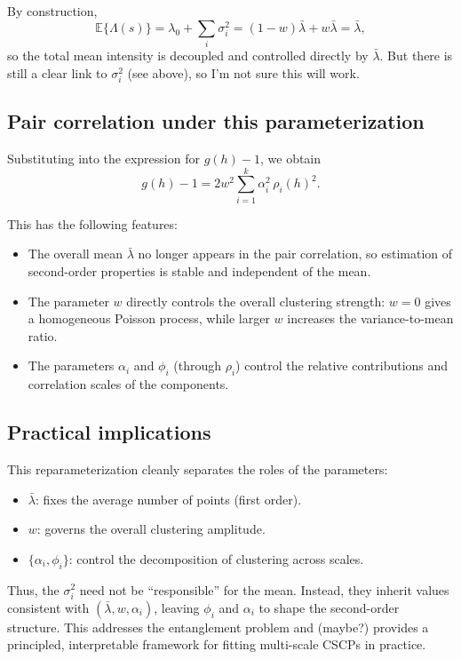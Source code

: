 \documentclass[11pt]{article}
\begin{document}
By construction,
\[
\mathbb E\{\Lambda(s)\} = \lambda_0 + \sum_i \sigma_i^2 = (1-w)\bar\lambda + w\bar\lambda = \bar\lambda,
\]
so the total mean intensity is decoupled and controlled directly by $\bar\lambda$. But there is still a clear link to $\sigma_i^2$ (see above), so I'm not sure this will work.

\subsection{Pair correlation under this parameterization}

Substituting into the expression for $g(h)-1$, we obtain
\[
g(h)-1 = 2w^2 \sum_{i=1}^k \alpha_i^2 \,\rho_i(h)^2.
\]

This has the following features:
\begin{itemize}
	\item The overall mean $\bar\lambda$ no longer appears in the pair correlation, so estimation of second-order properties is stable and independent of the mean.
	\item The parameter $w$ directly controls the overall clustering strength: $w=0$ gives a homogeneous Poisson process, while larger $w$ increases the variance-to-mean ratio.
	\item The parameters $\alpha_i$ and $\phi_i$ (through $\rho_i$) control the relative contributions and correlation scales of the components.  
\end{itemize}

\subsection{Practical implications}

This reparameterization cleanly separates the roles of the parameters:
\begin{itemize}
	\item $\bar\lambda$: fixes the average number of points (first order).
	\item $w$: governs the overall clustering amplitude.
	\item $\{\alpha_i,\phi_i\}$: control the decomposition of clustering across scales.
\end{itemize}

Thus, the $\sigma_i^2$ need not be “responsible” for the mean. Instead, they inherit values consistent with $(\bar\lambda,w,\alpha_i)$, leaving $\phi_i$ and $\alpha_i$ to shape the second-order structure. This addresses the entanglement problem and (maybe?) provides a principled, interpretable framework for fitting multi-scale CSCPs in practice.
\end{document}
